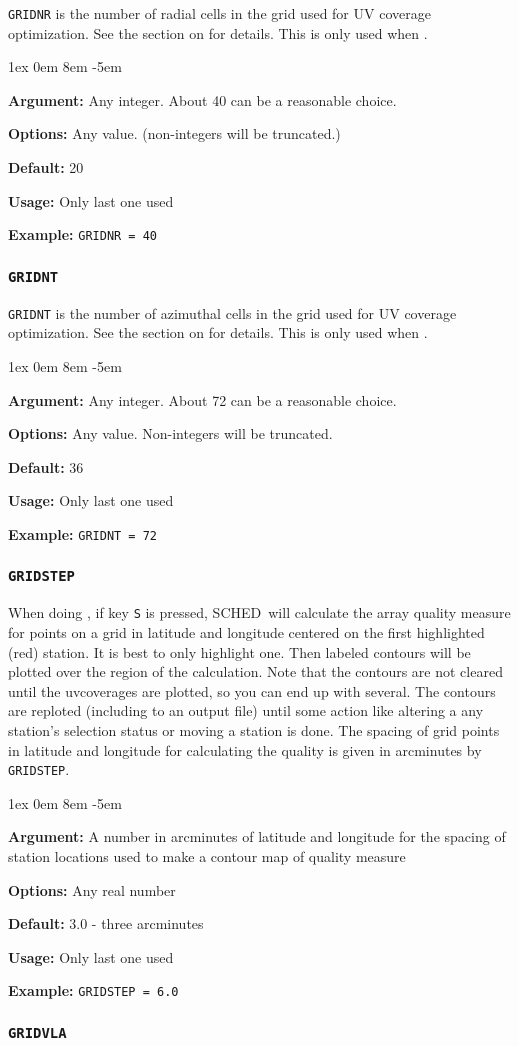 \documentclass{report}
\newcommand{\schedb}{{\sc SCHED~}}
\newcommand{\rcwbox}[5]{
  \begin{list}{}{\parsep 1ex  \itemsep 0em
                 \leftmargin 8em  \itemindent -5em }
    \item {\bf Argument:} #1
    \item {\bf Options:}  #2
    \item {\bf Default:}  #3
    \item {\bf Usage:}    #4
    \item {\bf Example:}  #5
  \end{list}
}
\begin{document}
{\tt GRIDNR} is the number of radial cells in the grid used for UV
coverage optimization.  See the section on  for details. This is only used when
.

\rcwbox
{Any integer.  About 40 can be a reasonable choice.}
{Any value. (non-integers will be truncated.)}
{20}
{Only last one used}
{{\tt GRIDNR = 40}}

\subsubsection{\label{MP:GRIDNT}{\tt GRIDNT}}

{\tt GRIDNT} is the number of azimuthal cells in the grid used for UV
coverage optimization.  See the section on  for details.  This is only used when
.

\rcwbox
{Any integer.  About 72 can be a reasonable choice.}
{Any value. Non-integers will be truncated.}
{36}
{Only last one used}
{{\tt GRIDNT = 72}}

\subsubsection{\label{MP:GRIDSTEP}{\tt GRIDSTEP}}

When doing , if key {\tt S}
is pressed, \schedb will calculate the array quality measure for
points on a grid in latitude and longitude centered on the first
highlighted (red) station.  It is best to only highlight one.  Then
labeled contours will be plotted over the region of the calculation.
Note that the contours are not cleared until the uvcoverages are
plotted, so you can end up with several.  The contours are reploted
(including to an output file) until some action like altering a any
station's selection status or moving a station is done.  The spacing
of grid points in latitude and longitude for calculating the quality
is given in arcminutes by {\tt GRIDSTEP}.

\rcwbox
{A number in arcminutes of latitude and longitude for the spacing of
station locations used to make a contour map of quality measure}
{Any real number}
{3.0 - three arcminutes}
{Only last one used}
{{\tt GRIDSTEP = 6.0}}

\subsubsection{\label{MP:GRIDVLA}{\tt GRIDVLA}}
\end{document}
